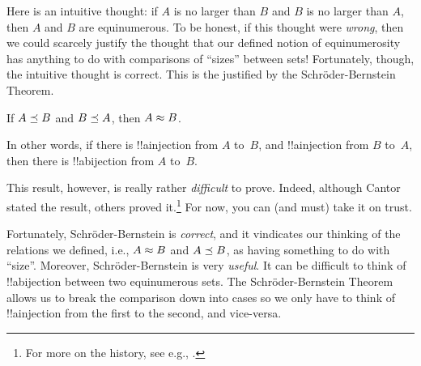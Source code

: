 \documentclass[../../../include/open-logic-section]{subfiles}
\begin{document}


\begin{explain}
Here is an intuitive thought: if $A$ is no larger than $B$ and $B$ is
no larger than $A$, then $A$ and $B$ are equinumerous. To be honest,
if this thought were \emph{wrong}, then we could scarcely justify the
thought that our defined notion of equinumerosity has anything to do
with comparisons of ``sizes'' between sets!{} Fortunately, though,
the intuitive thought is correct. This is the justified by the
Schr\"oder-Bernstein Theorem.
\end{explain}

\begin{thm}
	If $A \preceq B$ and $B \preceq A$,
	then $A \approx B$.
\end{thm}

\begin{explain}
In other words, if there is !!a{injection} from $A$ to~$B$, and
!!a{injection} from $B$ to~$A$, then there is !!a{bijection} from $A$
to~$B$. 

This result, however, is really rather \emph{difficult} to prove.
Indeed, although Cantor stated the result, others proved
it.\footnote{For more on the history, see e.g.,
\citet[pp.~165--6]{Potter2004}.}
% 
For now, you can (and must)
take it on trust. 

Fortunately, Schr\"oder-Bernstein is \emph{correct}, and it
vindicates our thinking of the relations we defined, i.e.,
$A \approx B$ and $A \preceq B$, as having something to do with
``size''. Moreover, Schr\"oder-Bernstein is very \emph{useful}. It
can be difficult to think of !!a{bijection} between two equinumerous
sets. The Schr\"oder-Bernstein Theorem allows us to break the comparison
down into cases so we only have to think of !!a{injection} from the
first to the second, and vice-versa.
\end{explain}
\end{document}
